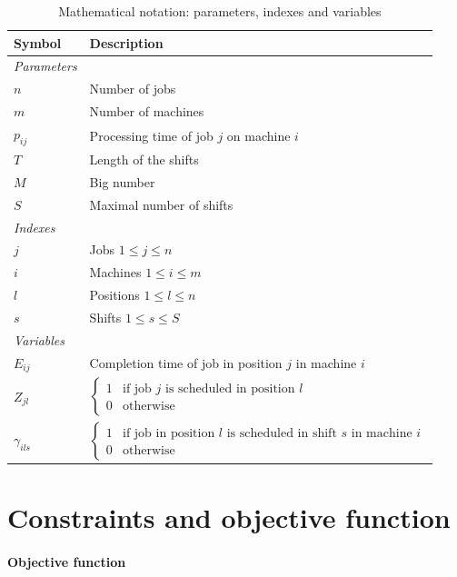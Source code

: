 \newpage
\begin{table}
\centering
\caption{Mathematical notation: parameters, indexes and variables}
\label{tab:notation}
\begin{tabular}{@{}ll@{}}
\toprule
\textbf{Symbol} & \textbf{Description} \\ \midrule
\textit{Parameters} & \\
$n$ & Number of jobs \\
$m$ & Number of machines \\
$p_{ij}$ & Processing time of job $j$ on machine $i$ \\
$T$ & Length of the shifts \\
$M$ & Big number \\
$S$ & Maximal number of shifts \\ \midrule
\textit{Indexes} & \\
$j$ & Jobs $1 \le j \le n$ \\
$i$ & Machines $1 \le i \le m$ \\
$l$ & Positions $1 \le l \le n$ \\
$s$ & Shifts $1 \le s \le S$ \\ \midrule
\textit{Variables} & \\
$E_{ij}$ & Completion time of job in position $j$ in machine $i$ \\[2ex]
$Z_{jl}$ & $\begin{cases} 1 & \text{if job } j \text{ is scheduled in position } l \\ 0 & \text{otherwise} \end{cases}$ \\[4ex]
$\gamma_{ils}$ & $\begin{cases} 1 & \text{if job in position } l \text{ is scheduled in shift } s \text{ in machine } i \\ 0 & \text{otherwise} \end{cases}$ \\ \bottomrule
\end{tabular}
\end{table}

\section[Constraints and objective function]{Constraints and objective function}

\paragraph{Objective function}


